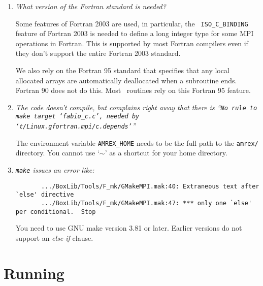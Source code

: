 \begin{enumerate}

\item {\em What version of the Fortran standard is needed?}

  Some features of Fortran 2003 are used, in particular, the {\tt
    ISO\_C\_BINDING} feature of Fortran 2003 is needed to define a long
  integer type for some MPI operations in Fortran.  This is supported
  by most Fortran compilers even if they don't support the entire
  Fortran 2003 standard.

  We also rely on the Fortran 95 standard that specifies that any
  local allocated arrays are automatically deallocated when a
  subroutine ends.  Fortran 90 does not do this.  Most
  \maestro\ routines rely on this Fortran 95 feature.


\item {\em The code doesn't compile, but complains right away that there
   is ``{\tt No rule to make target `fabio\_c.c', needed by `t/Linux.gfortran.mpi/c.depends'}''}

   The environment variable {\tt AMREX\_HOME} needs to be the full path
   to the {\tt amrex/} directory.  You cannot use `{\tt $\sim$}' as a shortcut
   for your home directory.
  
\item {\em {\tt make} issues an error like:
       {\small
       \begin{verbatim}
       .../BoxLib/Tools/F_mk/GMakeMPI.mak:40: Extraneous text after `else' directive
       .../BoxLib/Tools/F_mk/GMakeMPI.mak:47: *** only one `else' per conditional.  Stop
      \end{verbatim}
      }
      }

   You need to use GNU make version 3.81 or later.  Earlier versions do
   not support an {\em else-if} clause.

\end{enumerate}

\section{Running}

